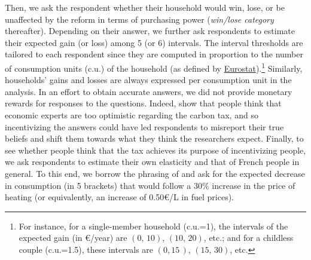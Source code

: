 \documentclass[12pt]{article} %
\begin{document}
Then, we ask the respondent whether their household would win, lose, or be unaffected by the reform in terms of purchasing power (\textit{win/lose category} thereafter). Depending on their answer, we further ask respondents to estimate their expected gain (or loss) among 5 (or 6) intervals. The interval thresholds are tailored to each respondent since they are computed in proportion to the number of consumption units (c.u.) of the household (as defined by \href{http://ec.europa.eu/eurostat/statistics-explained/index.php/Glossary:Equivalised_disposable_income}{Eurostat}).\footnote{For instance, for a single-member household (c.u.=1), the intervals of the expected gain (in \euro{}/year) are $\left(0,\,10\right)$, $\left(10,\,20\right)$, etc.; and for a childless couple (c.u.=1.5), these intervals are $\left(0,15\,\right)$, $\left(15,\,30\right)$, etc.} Similarly, households' gains and losses are always expressed per consumption unit in the analysis. In an effort to obtain accurate answers, we did not provide monetary rewards for responses to the questions. Indeed, \citet{sapienza_zingales_2013} show that people think that economic experts are too optimistic regarding the carbon tax, and so incentivizing the answers could have led respondents to misreport their true beliefs and shift them towards what they think the researchers expect. Finally, to see whether people think that the tax achieves its purpose of incentivizing people, we ask respondents to estimate their own elasticity and that of French people in general. To this end, we borrow the phrasing of \citet{baranzini_effectiveness_2017} and ask for the expected decrease in consumption (in 5 brackets) that would follow a 30\% increase in the price of heating (or equivalently, an increase of 0.50\euro{}/L in fuel prices).



\end{document}
